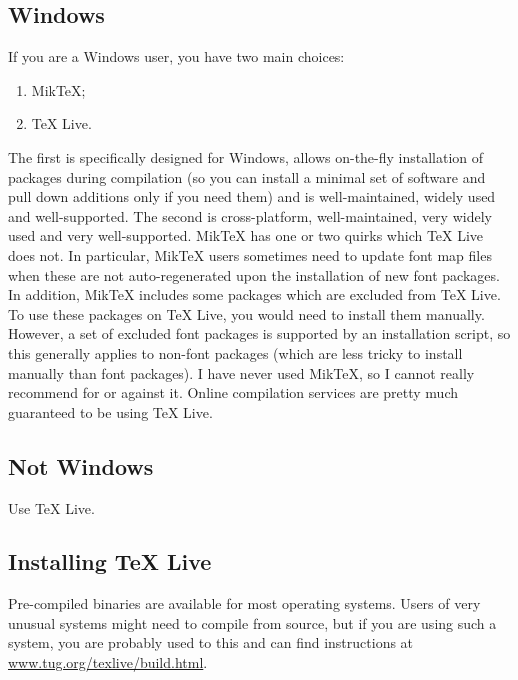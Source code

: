 \subsection<1-| beamer:0>{Windows}\label{subsec:win}

If you are a Windows user, you have two main choices:
\begin{enumerate}
  \item Mik\TeX{};
  \item \TeX{} Live.
\end{enumerate}
The first is specifically designed for Windows, allows on-the-fly installation of packages during compilation (so you can install a minimal set of software and pull down additions only if you need them) and is well-maintained, widely used and well-supported.
The second is cross-platform, well-maintained, very widely used and very well-supported.
Mik\TeX{} has one or two quirks which \TeX{} Live does not.
In particular, Mik\TeX{} users sometimes need to update font map files when these are not auto-regenerated upon the installation of new font packages. 
In addition, Mik\TeX{} includes some packages which are excluded from \TeX{} Live.
To use these packages on \TeX{} Live, you would need to install them manually.
However, a set of excluded font packages is supported by an installation script, so this generally applies to non-font packages (which are less tricky to install manually than font packages).
I have never used Mik\TeX{}, so I cannot really recommend for or against it.
Online compilation services are pretty much guaranteed to be using \TeX{} Live.


\subsection<1-| beamer:0>{Not Windows}\label{subsec:not-win}

Use \TeX{} Live.


\subsection<1-| beamer:0>{Installing \TeX{} Live}\label{subsec:tl}

Pre-compiled binaries are available for most operating systems.
Users of very unusual systems might need to compile from source, but if you are using such a system, you are probably used to this and can find instructions at \url{www.tug.org/texlive/build.html}.

